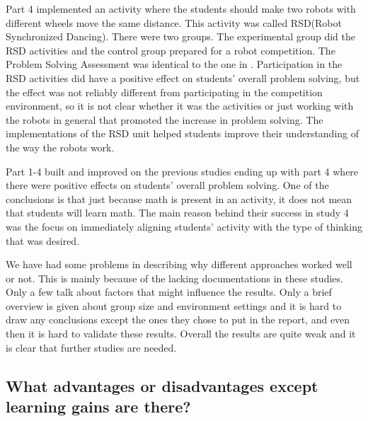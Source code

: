 \bigskip\noindent
Part 4 implemented an activity where the students should make two robots with different wheels move the same distance. This activity was called RSD(Robot Synchronized Dancing). There were two groups. The experimental group did the RSD activities and the control group prepared for a robot competition. The Problem Solving Assessment was identical to the one in . Participation in the RSD activities did have a positive effect on students' overall problem solving, but the effect was not reliably different from participating in the competition environment, so it is not clear whether it was the activities or just working with the robots in general that promoted the increase in problem solving. The implementations of the RSD unit helped students improve their understanding of the way the robots work. 

\bigskip\noindent
Part 1-4 built and improved on the previous studies ending up with part 4 where there were positive effects on students' overall problem solving. One of the conclusions is that just because math is present in an activity, it does not mean that students will learn math. The main reason behind their success in study 4 was the focus on immediately aligning students' activity with the type of thinking that was desired.

\bigskip\noindent
We have had some problems in describing why different approaches worked well or not. This is mainly because of the lacking documentations in these studies. Only a few talk about factors that might influence the results. Only a brief overview is given about group size and environment settings and it is hard to draw any conclusions except the ones they chose to put in the report, and even then it is hard to validate these results. Overall the results are quite weak and it is clear that further studies are needed.

\subsection*{What advantages or disadvantages except learning gains are there?}\label{sec:whatAdvantage}

